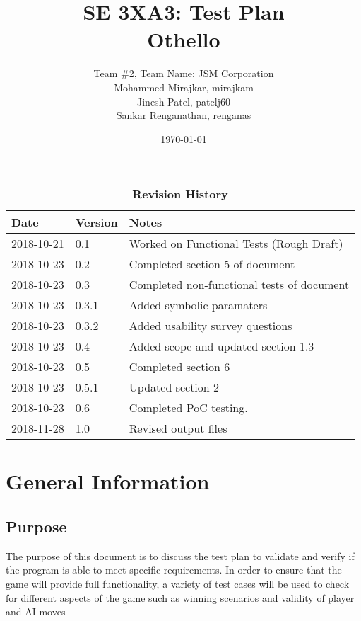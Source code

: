 \documentclass[12pt, titlepage]{article}
\title{SE 3XA3: Test Plan\\Othello}
\author{Team \#2, Team Name: JSM Corporation
		\\ Mohammed Mirajkar, mirajkam
		\\ Jinesh Patel, patelj60
		\\ Sankar Renganathan, renganas
}
\date{\today}
\begin{document}
\maketitle

\tableofcontents
\listoftables
\listoffigures

\begin{table}[bp]
	\caption{\bf Revision History}
	\begin{tabularx}{\textwidth}{p{2cm}p{2cm}X}
		\toprule {\bf Date} & {\bf Version} & {\bf Notes}                                \\
		\midrule
		2018-10-21          & 0.1           & Worked on Functional Tests (Rough Draft)   \\
		2018-10-23          & 0.2           & Completed section 5 of document            \\
		2018-10-23          & 0.3           & Completed non-functional tests of document \\
		2018-10-23          & 0.3.1         & Added symbolic paramaters                  \\
		2018-10-23          & 0.3.2         & Added usability survey questions           \\
		2018-10-23          & 0.4           & Added scope and updated section 1.3        \\
		2018-10-23          & 0.5           & Completed section 6                        \\
		2018-10-23          & 0.5.1         & Updated section 2                          \\
		2018-10-23          & 0.6           & Completed PoC testing.                     \\
		2018-11-28          & 1.0           &Revised output files                     \\
		\bottomrule
	\end{tabularx}
\end{table}

\newpage


\section{General Information}

\subsection{Purpose}
The purpose of this document is to discuss the test plan to validate and verify if the program is able to meet specific requirements. In order to ensure that the game will provide full functionality, a variety of test cases will be used to check for different aspects of the game such as winning scenarios and validity of player and AI moves
\end{document}
